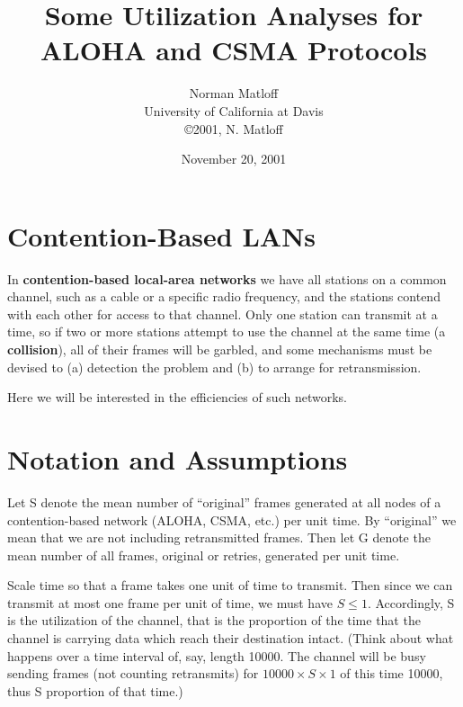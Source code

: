 \documentclass[11pt]{article}
\begin{document}
\pagestyle{fancy}

\title{Some Utilization Analyses for ALOHA and CSMA Protocols}

\author{Norman Matloff \\
University of California at Davis\\
        \copyright{}2001, N. Matloff}                      

\date{November 20, 2001}

\maketitle

\section{Contention-Based LANs}

In {\bf contention-based local-area networks} we have all stations on
a common channel, such as a cable or a specific radio frequency, and
the stations contend with each other for access to that channel.  Only
one station can transmit at a time, so if two or more stations attempt
to use the channel at the same time (a {\bf collision}), all of their
frames will be garbled, and some mechanisms must be devised to (a)
detection the problem and (b) to arrange for retransmission.

Here we will be interested in the efficiencies of such networks.

\section{Notation and Assumptions}

Let S denote the mean number of ``original'' frames generated at all
nodes of a contention-based network (ALOHA, CSMA, etc.) per unit 
time.  By ``original'' we mean that we are not including retransmitted
frames.  Then let G denote the mean number of all frames, original
or retries, generated per unit time.

Scale time so that a frame takes one unit of time to transmit.  Then
since we can transmit at most one frame per unit of time, we must have
$S \leq 1$.  Accordingly, S is the utilization of the channel, that
is the proportion of the time that the channel is carrying data which
reach their destination intact.  (Think about what happens over a time
interval of, say, length 10000.  The channel will be busy sending frames
(not counting retransmits) for $10000 \times S \times 1$ of this time
10000, thus S proportion of that time.)
\end{document}
